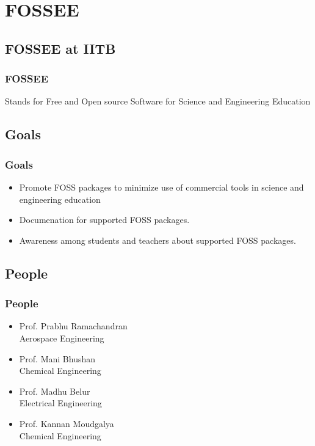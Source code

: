 \documentclass[compress,red]{beamer} %
\begin{document}
\section{FOSSEE}

\subsection{FOSSEE at IITB}
\begin{frame}
\frametitle{FOSSEE}
\begin{block}{Stands for}
Free and Open source Software for Science and Engineering
Education
\end{block}
\vspace{1cm}
\begin{overlayarea}{\textwidth}{5cm}
\end{overlayarea}
\end{frame}

\subsection{Goals}
\begin{frame}
\frametitle{Goals}
\begin{itemize}
\item Promote \alert{FOSS} packages to minimize use of commercial tools in science and engineering education
\item Documenation for supported \alert{FOSS} packages.
\item Awareness among students and teachers about supported \alert{FOSS} packages. 
\end{itemize}
\end{frame}

\subsection{People}
\begin{frame}
\frametitle{People}
\begin{itemize}
\item Prof. Prabhu Ramachandran \\ 
{\footnotesize Aerospace Engineering} \pause
\item Prof. Mani Bhushan \\
{\footnotesize Chemical Engineering}  \pause
\item Prof. Madhu Belur \\
{\footnotesize Electrical Engineering} \pause
\item Prof. Kannan Moudgalya \\
{\footnotesize Chemical Engineering} \pause
\end{itemize}
\end{frame}
\end{document}
